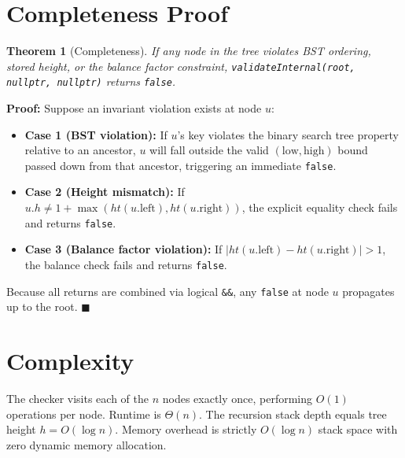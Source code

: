 \documentclass[11pt,a4paper]{article}
\newtheorem{theorem}{Theorem}
\newenvironment{proof}{\noindent\textbf{Proof:}\enspace}{\hfill$\blacksquare$\par\medskip}
\begin{document}
\section{Completeness Proof}
\begin{theorem}[Completeness]
If any node in the tree violates BST ordering, stored height, or the balance factor constraint, \texttt{validateInternal(root, nullptr, nullptr)} returns \texttt{false}.
\end{theorem}
\begin{proof}
Suppose an invariant violation exists at node $u$:
\begin{itemize}
    \item \textbf{Case 1 (BST violation):} If $u$'s key violates the binary search tree property relative to an ancestor, $u$ will fall outside the valid $(\text{low}, \text{high})$ bound passed down from that ancestor, triggering an immediate \texttt{false}.
    \item \textbf{Case 2 (Height mismatch):} If $u.h \ne 1 + \max(ht(u.\text{left}), ht(u.\text{right}))$, the explicit equality check fails and returns \texttt{false}.
    \item \textbf{Case 3 (Balance factor violation):} If $|ht(u.\text{left}) - ht(u.\text{right})| > 1$, the balance check fails and returns \texttt{false}.
\end{itemize}
Because all returns are combined via logical \texttt{\&\&}, any \texttt{false} at node $u$ propagates up to the root.
\end{proof}

\section{Complexity}
The checker visits each of the $n$ nodes exactly once, performing $O(1)$ operations per node. Runtime is $\Theta(n)$. The recursion stack depth equals tree height $h = O(\log n)$. Memory overhead is strictly $O(\log n)$ stack space with zero dynamic memory allocation.
\end{document}
